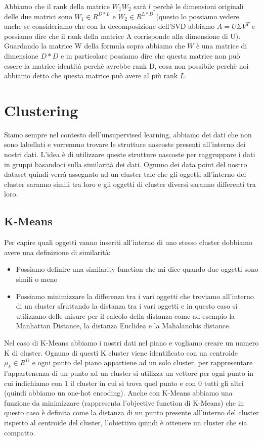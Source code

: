 \documentclass[14pt]{extreport}
\begin{document}
Abbiamo che il rank della matrice $W_1W_2$ sarà $l$ perchè le dimensioni originali delle due matrici sono $W_1 \in R^{D*L}$ e $W_2 \in R^{L*D}$ (questo lo 
possiamo vedere anche se consideriamo che con la decomposizione dell'SVD abbiamo $A = U \Sigma V^{T}$ e possiamo dire che il rank della matrice A corrisponde 
alla dimensione di U).
Guardando la matrice W della formula sopra abbiamo che $W$ è una matrice di dimensione $D*D$ e in particolare possiamo dire che questa matrice 
non può essere la matrice identità perchè avrebbe rank D, cosa non possibile perchè noi abbiamo detto che questa matrice può avere al più rank $L$.

\chapter{Clustering}

Siamo sempre nel contesto dell'unsupervised learning, abbiamo dei dati che non sono labellati e vorremmo trovare le strutture nascoste presenti all'interno 
dei nostri dati.
L'idea è di utilizzare queste strutture nascoste per raggruppare i dati in gruppi basandoci sulla similarità dei dati.
Ognuno dei data point del nostro dataset quindi verrà assegnato ad un cluster tale che gli oggetti all'interno del cluster saranno simili tra loro 
e gli oggetti di cluster diversi saranno differenti tra loro.

\section{K-Means}

Per capire quali oggetti vanno inseriti all'interno di uno stesso cluster dobbiamo avere una definizione di similarità:
\begin{itemize}
\item Possiamo definire una similarity function che mi dice quando due oggetti sono simili o meno
\item Possiamo minimizzare la differenza tra i vari oggetti che troviamo all'interno di un cluster sfruttando la distanza tra i vari oggetti
e in questo caso si utilizzano delle misure per il calcolo della distanza come ad esempio la Manhattan Distance, la distanza Euclidea e la Mahalanobis distance.
\end{itemize}

Nel caso di K-Means abbiamo i nostri dati nel piano e vogliamo creare un numero K di cluster.
Ognuno di questi K cluster viene identificato con un centroide $\mu_k \in R^D$ e ogni punto del piano appartiene ad un solo cluster, per rappresentare 
l'appartenenza di un punto ad un cluster si utilizza un vettore per ogni punto in cui indichiamo con 1 il cluster in cui si trova quel punto e con 0 
tutti gli altri (quindi abbiamo un one-hot encoding).
Anche con K-Means abbiamo una funzione da minimizzare (rappresenta l'objective function di K-Means) che in questo caso è definita come la distanza di un punto presente all'interno del cluster rispetto 
al centroide del cluster, l'obiettivo quindi è ottenere un cluster che sia compatto.
\end{document}
